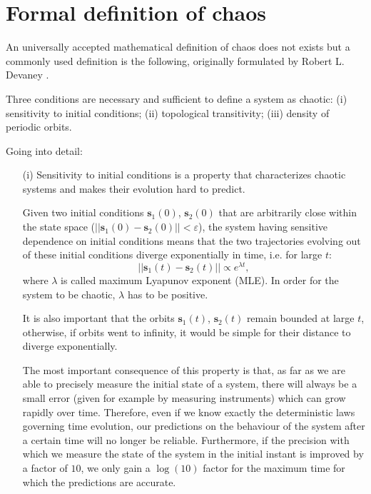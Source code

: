 \section{Formal definition of chaos}
\label{sec: chaos in theory}

An universally accepted mathematical definition of chaos does not exists but
a commonly used definition is the following, originally formulated by Robert L.
Devaney \cite{ref:chaos_definition}.

Three conditions are necessary and
sufficient to define a system as chaotic: (i) sensitivity to initial conditions;
(ii) topological transitivity;
(iii) density of periodic orbits.

Going into detail:
\begin{itemize}
    \item[(i)] Sensitivity to initial conditions is a property that characterizes chaotic
    systems and makes their evolution hard to predict.

    Given two initial conditions $\mathbf{s}_1(0)$, $\mathbf{s}_2(0)$ that are arbitrarily close within the state
    space ($||\mathbf{s}_1(0)-\mathbf{s}_2(0)||<\varepsilon$),
    the system having sensitive dependence on initial conditions means that
    the two trajectories evolving out of these initial conditions diverge exponentially in time, i.e.
    for large $t$:
    \begin{equation}
    \label{eq: trajectory divergence}
        ||\mathbf{s}_1(t)-\mathbf{s}_2(t)||\propto e^{\lambda t},
    \end{equation}
    where $\lambda$ is called maximum Lyapunov exponent (MLE).
    In order for the system to be chaotic, $\lambda$ has to be positive.

    It is also important that the orbits $\mathbf{s}_1(t)$, $\mathbf{s}_2(t)$ remain bounded at large $t$,
    otherwise, if orbits went to infinity, it would be simple for their distance to diverge exponentially.
    
    The most important consequence of this property is that, as far as we are
    able to precisely measure the initial state of a system, there will always be
    a small error (given for example by measuring instruments) which can grow
    rapidly over time. Therefore, even if we know exactly the deterministic laws
    governing time evolution, our predictions on the behaviour of the system
    after a certain time will no longer be reliable. Furthermore, if the precision
    with which we measure the state of the system in the initial instant is
    improved by a factor of $10$, we only gain a $\log(10)$ factor for the maximum
    time for which the predictions are accurate.


\end{itemize}
